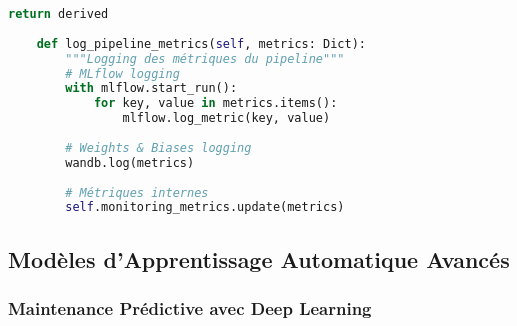 \documentclass[12pt,a4paper]{report}
\begin{document}
\begin{lstlisting}[language=Python, caption=Pipeline de données IA avec monitoring avancé]
        return derived
    
    def log_pipeline_metrics(self, metrics: Dict):
        """Logging des métriques du pipeline"""
        # MLflow logging
        with mlflow.start_run():
            for key, value in metrics.items():
                mlflow.log_metric(key, value)
        
        # Weights & Biases logging
        wandb.log(metrics)
        
        # Métriques internes
        self.monitoring_metrics.update(metrics)
\end{lstlisting}

\subsection{Modèles d'Apprentissage Automatique Avancés}

\subsubsection{Maintenance Prédictive avec Deep Learning}
\end{document}

